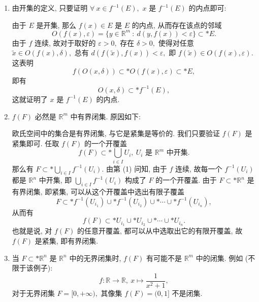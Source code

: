 \begin{solution}
\begin{enumerate}
\item 由开集的定义, 只要证明 $\forall ~ x \in f^{-1}(E),$ $x$ 是 $f^{-1}(E)$ 的内点即可:

由于 $E$ 是开集, 那么 $f(x) \in E$ 是 $E$ 的内点, 从而存在该点的邻域
\begin{equation*}
O(f(x), \varepsilon) = \{ y \in \mathbb{R}^m ~ : ~ d(y, f(x)) < \varepsilon \} \subset* E.
\end{equation*}
由于 $f$ 连续, 故对于取好的 $\varepsilon > 0,$ 存在 $\delta > 0,$ 使得对任意 $\widetilde{x} \in O(f(x), \delta),$ 总有 $d(f(\widetilde{x}), f(x)) < \varepsilon,$ 即 $f(\widetilde{x}) \in O(f(x), \varepsilon).$ 这表明
\begin{equation*}
f(O(x, \delta)) \subset* O(f(x), \varepsilon) \subset* E,
\end{equation*}
即有
\begin{equation*}
O(x, \delta) \subset* f^{-1}(E),
\end{equation*}
这就证明了 $x$ 是 $f^{-1}(E)$ 的内点.

\item $f(F)$ 必然是 $\mathbb{R}^m$ 中有界闭集. 原因如下:

欧氏空间中的集合是有界闭集, 与它是紧集是等价的. 我们只要验证 $f(F)$ 是紧集即可. 任取 $f(F)$ 的一个开覆盖
\begin{equation*}
f(F) \subset* \bigcup_{i \in I} U_i, ~ U_i \text{ 是 $\mathbb{R}^m$ 中开集}.
\end{equation*}
那么有 $\displaystyle F \subset* \bigcup_{i \in I} f^{-1}(U_i).$ 由第 (1) 问知, 由于 $f$ 连续, 故每一个 $f^{-1}(U_i)$ 都是 $\mathbb{R}^n$ 中开集, 即 $\displaystyle \bigcup_{i \in I} f^{-1}(U_i)$ 构成了 $F$ 的一个开覆盖. 由于 $F \subset* \mathbb{R}^n$ 是有界闭集, 即紧集, 可以从这个开覆盖中选出有限子覆盖
\begin{equation*}
F \subset* f^{-1}(U_{i_1}) \cup* f^{-1}(U_{i_2}) \cup* \cdots \cup* f^{-1}(U_{i_n}),
\end{equation*}
从而有
\begin{equation*}
f(F) \subset* U_{i_1} \cup* U_{i_2} \cup* \cdots \cup* U_{i_n}.
\end{equation*}
也就是说, 对 $f(F)$ 的任意开覆盖, 都可以从中选取出它的有限开覆盖, 故 $f(F)$ 是紧集, 即有界闭集.

\item 当 $F \subset* \mathbb{R}^n$ 是 $\mathbb{R}^n$ 中的无界闭集时, $f(F)$ 有可能不是 $\mathbb{R}^m$ 中的闭集. 例如 (不限于该例子):
\begin{equation*}
f: \mathbb{R} \rightarrow \mathbb{R}, ~ x \mapsto \dfrac{1}{x^2 + 1},
\end{equation*}
对于无界闭集 $F = [0, +\infty),$ 其像集 $f(F) = (0, 1]$ 不是闭集.
\end{enumerate}
\end{solution}


